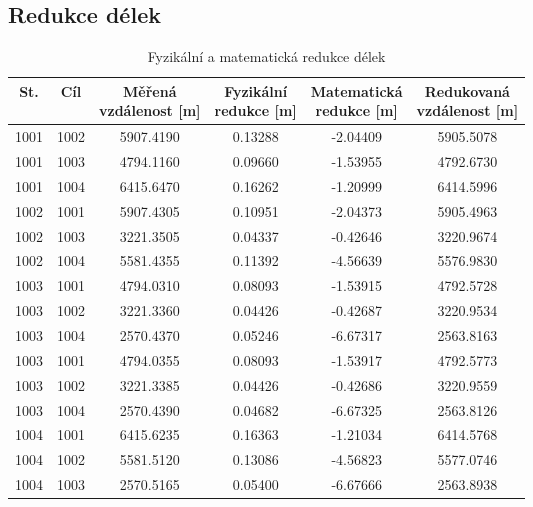 \subsection{Redukce délek}
\begin{table}[H]
\centering
\caption{Fyzikální a matematická redukce délek}
\begin{tabular}{|c|c||c||c|c||c|}
\hline
\textbf{St.} &\textbf{ Cíl} & \makecell{\textbf{Měřená}\\\textbf{vzdálenost [m]}} & \makecell{\textbf{Fyzikální}\\\textbf{redukce [m]}} & \makecell{\textbf{Matematická}\\\textbf{redukce [m]}} & \makecell{\textbf{Redukovaná}\\\textbf{vzdálenost [m]}}\\ 
\hline\hline
1001 & 1002 & 5907.4190 & 0.13288 & -2.04409 & 5905.5078 \\ \hline
1001 & 1003 & 4794.1160 & 0.09660 & -1.53955 & 4792.6730 \\ \hline
1001 & 1004 & 6415.6470 & 0.16262 & -1.20999 & 6414.5996 \\ \hline
1002 & 1001 & 5907.4305 & 0.10951 & -2.04373 & 5905.4963 \\ \hline
1002 & 1003 & 3221.3505 & 0.04337 & -0.42646 & 3220.9674 \\ \hline
1002 & 1004 & 5581.4355 & 0.11392 & -4.56639 & 5576.9830 \\ \hline
1003 & 1001 & 4794.0310 & 0.08093 & -1.53915 & 4792.5728 \\ \hline
1003 & 1002 & 3221.3360 & 0.04426 & -0.42687 & 3220.9534 \\ \hline
1003 & 1004 & 2570.4370 & 0.05246 & -6.67317 & 2563.8163 \\ \hline
1003 & 1001 & 4794.0355 & 0.08093 & -1.53917 & 4792.5773 \\ \hline
1003 & 1002 & 3221.3385 & 0.04426 & -0.42686 & 3220.9559 \\ \hline
1003 & 1004 & 2570.4390 & 0.04682 & -6.67325 & 2563.8126 \\ \hline
1004 & 1001 & 6415.6235 & 0.16363 & -1.21034 & 6414.5768 \\ \hline
1004 & 1002 & 5581.5120 & 0.13086 & -4.56823 & 5577.0746 \\ \hline
1004 & 1003 & 2570.5165 & 0.05400 & -6.67666 & 2563.8938 \\ 
\hline
\end{tabular}
\end{table}



